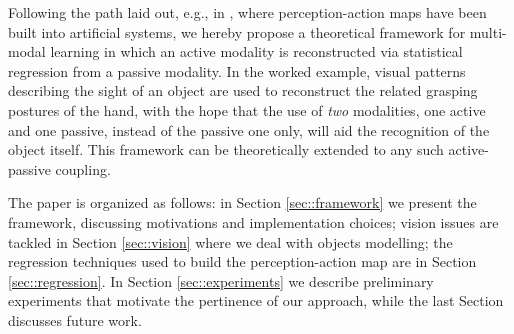 Following the path laid out, e.g., in \cite{metta,2007.AR}, where perception-action maps have been built into artificial systems, we hereby propose a theoretical framework for multi-modal learning in which an active modality is reconstructed via statistical regression from a passive modality. In the worked example, visual patterns describing the sight of an object are used to reconstruct the related grasping postures of the hand, with the hope that the use of \emph{two} modalities, one active and one passive, instead of the passive one only, will aid the recognition of the object itself. This framework can be theoretically extended to any such active-passive coupling.

The paper is organized as follows: in Section \ref{sec::framework} we present the framework, discussing motivations and implementation choices; vision issues are tackled in Section \ref{sec::vision} where we deal with objects modelling; the regression techniques used to build the perception-action map are in Section \ref{sec::regression}. In Section \ref{sec::experiments} we describe preliminary experiments that motivate the pertinence of our approach, while the last Section discusses future work.

